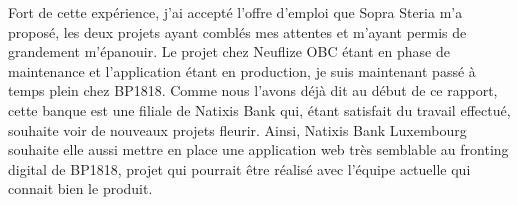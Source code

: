 \begin{changemargin}{-1cm}{-1cm}
	Fort de cette expérience, j'ai accepté l'offre d'emploi que Sopra Steria m'a proposé, les deux projets ayant comblés mes attentes et m'ayant permis de grandement m'épanouir. Le projet chez Neuflize OBC étant en phase de maintenance et l'application étant en production, je suis maintenant passé à temps plein chez BP1818. Comme nous l'avons déjà dit au début de ce rapport, cette banque est une filiale de Natixis Bank qui, étant satisfait du travail effectué, souhaite voir de nouveaux projets fleurir. Ainsi, Natixis Bank Luxembourg souhaite elle aussi mettre en place une application web très semblable au fronting digital de BP1818, projet qui pourrait être réalisé avec l'équipe actuelle qui connait bien le produit.
	
\end{changemargin}
